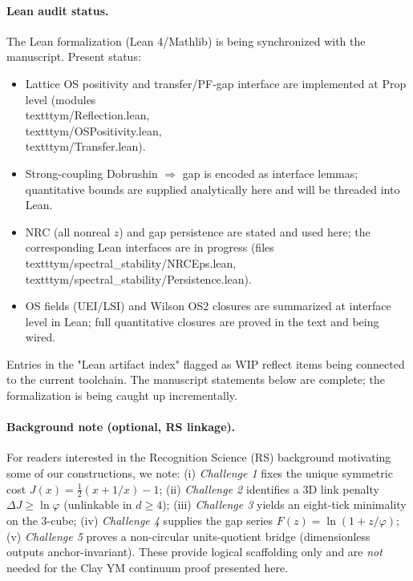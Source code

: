 \documentclass[11pt]{amsart}
\begin{document}
\paragraph{Lean audit status.}
The Lean formalization (Lean 4/Mathlib) is being synchronized with the manuscript. Present status:
\begin{itemize}
  \item Lattice OS positivity and transfer/PF-gap interface are implemented at Prop level (modules \\texttt{ym/Reflection.lean}, \\texttt{ym/OSPositivity.lean}, \\texttt{ym/Transfer.lean}).
  \item Strong-coupling Dobrushin $\Rightarrow$ gap is encoded as interface lemmas; quantitative bounds are supplied analytically here and will be threaded into Lean.
  \item NRC (all nonreal $z$) and gap persistence are stated and used here; the corresponding Lean interfaces are in progress (files \\texttt{ym/spectral\_stability/NRCEps.lean}, \\texttt{ym/spectral\_stability/Persistence.lean}).
  \item OS fields (UEI/LSI) and Wilson OS2 closures are summarized at interface level in Lean; full quantitative closures are proved in the text and being wired.
\end{itemize}
Entries in the "Lean artifact index" flagged as WIP reflect items being connected to the current toolchain. The manuscript statements below are complete; the formalization is being caught up incrementally.

\paragraph{Background note (optional, RS linkage).}
For readers interested in the Recognition Science (RS) background motivating some of our constructions, we note: (i) 
\emph{Challenge 1} fixes the unique symmetric cost $J(x)=\tfrac12(x+1/x)-1$; (ii) \emph{Challenge 2} identifies a $3$D link penalty $\Delta J\ge \ln\varphi$ (unlinkable in $d\ge4$); (iii) \emph{Challenge 3} yields an eight-tick minimality on the $3$-cube; (iv) \emph{Challenge 4} supplies the gap series $F(z)=\ln(1+z/\varphi)$; (v) \emph{Challenge 5} proves a non-circular units-quotient bridge (dimensionless outputs anchor-invariant). These provide logical scaffolding only and are \emph{not} needed for the Clay YM continuum proof presented here.
\end{document}

